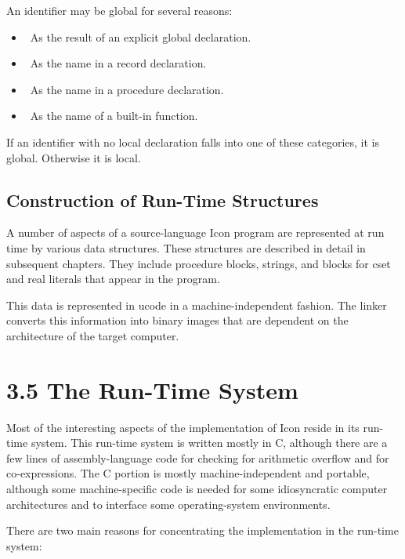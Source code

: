 An identifier may be global for several reasons:

\liststyleLii
\begin{itemize}
\item 
\ As the result of an explicit global declaration.
\item 
\ As the name in a record declaration.
\item 
\ As the name in a procedure declaration.
\item 
\ As the name of a built-in function.
\end{itemize}

If an identifier with no local declaration falls into one of these
categories, it is global. Otherwise it is local.

\subsection{Construction of Run-Time Structures}

A number of aspects of a source-language Icon program are represented
at run time by various data structures. These structures are described
in detail in subsequent chapters. They include procedure blocks,
strings, and blocks for cset and real literals that appear in the
program.


This data is represented in ucode in a machine-independent
fashion. The linker converts this information into binary images that
are dependent on the architecture of the target computer.

\section[3.5 The Run{}-Time System]{3.5 The Run-Time System}

Most of the interesting aspects of the implementation of Icon reside
in its run-time system. This run-time system is written mostly in C,
although there are a few lines of assembly-language code for checking
for arithmetic overflow and for co-expressions. The C portion is
mostly machine-independent and portable, although some
machine-specific code is needed for some idiosyncratic computer
architectures and to interface some operating-system environments.

There are two main reasons for concentrating the implementation in the
run-time system:

